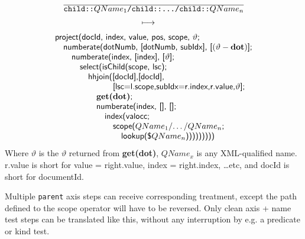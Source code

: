 \begin{equation}
\begin{array}{c}
\frac{}{\displaystyle \mbox{\texttt{child::}}QName_1\mbox{\texttt{/child::\ldots/child::}}QName_n} \\ 
\longmapsto \begin{array}{c}\mbox{\tiny } \\ \mbox{\tiny } \end{array} \\
\begin{array}{l}
\mbox{\textsf{project(docId, index, value, pos, scope, }}\vartheta\mbox{\textsf{;}} \\ \quad
\mbox{\textsf{numberate(dotNumb, [dotNumb, subIdx], [}}(\vartheta-\mbox{\textbf{dot}})\mbox{\textsf{];}} \\
\quad\quad 
\mbox{\textsf{numberate(index, [index], [}}\vartheta\mbox{\textsf{];}} \\ \quad\quad\quad
\mbox{\textsf{select(isChild(scope, lsc);}} \\ \quad \quad\quad\quad
\mbox{\textsf{hhjoin([docId],[docId],}} \\ \quad\quad\quad\quad\quad\quad\quad
\mbox{\textsf{[lsc=l.scope,subIdx=r.index,r.value,}}\vartheta\mbox{\textsf{];}}\\
\quad\quad\quad\quad\quad \mbox{\textbf{get(dot)}\textsf{;}} \\ \quad \quad\quad \quad\quad
\mbox{\textsf{numberate(index, [], [];}}\\ \quad\quad\quad\quad\quad\quad
\mbox{\textsf{index(valocc;}} \\ \quad\quad\quad\quad\quad\quad\quad
\mbox{\textsf{scope(}}QName_1\mbox{\textsf{/\ldots/}}QName_n\mbox{\textsf{;}}\\
\quad\quad\quad\quad\quad\quad\quad\quad
\mbox{\textsf{lookup(\$}}QName_n\mbox{\textsf{)))))))))}}
\end{array}
\end{array}
\label{rule:trans:TD:pathChild}
\end{equation}
Where $\vartheta$ is the $\vartheta$ returned from \textbf{get(dot)}, $QName_x$ is any XML-qualified name.
\textsf{r.value} is short for \textsf{value = right.value, index = right.index, \ldots etc}, and \textsf{docId} is
short for \textsf{documentId}.

Multiple \texttt{parent} axis steps can receive corresponding treatment, except the path defined to the
\textsf{scope} operator will have to be reversed. Only clean axis + name test steps can be translated
like this, without any interruption by e.g. a predicate or kind test.

